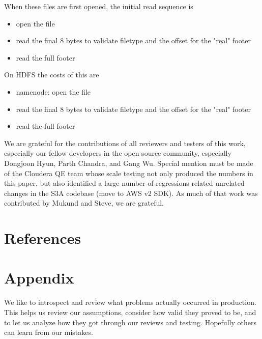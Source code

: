 \documentclass[manuscript]{acmart}
\begin{document}
When these files are first opened, the initial read sequence is

\begin{itemize}
  \item{open the file}
  \item{read the final 8 bytes to validate filetype and the offset for the "real" footer}
  \item{read the full footer}
\end{itemize}

On HDFS the costs of this are
\begin{itemize}
  \item{namenode: open the file}
  \item{read the final 8 bytes to validate filetype and the offset for the "real" footer}
  \item{read the full footer}
\end{itemize}







\begin{acks}
We are grateful for the contributions of all reviewers and testers of this work,
especially our fellow developers in the open source community,
especially Dongjoon Hyun, Parth Chandra, and Gang Wu.
Special mention must be made of the Cloudera QE team whose scale testing
not only produced the numbers in this paper, but also identified a large number
of regressions related unrelated changes in the S3A codebase (move to AWS v2 SDK).
As much of that work was contributed by Mukund and Steve, we are grateful.
\end{acks}



\section{References}
\label{sec:references}







\appendix{}

\section{Appendix}
We like to introspect and review what problems actually occurred
in production.
This helps us review our assumptions, consider how valid they proved
to be, and to let us analyze how they got through our reviews and testing.
Hopefully others can learn from our mistakes.
\end{document}
